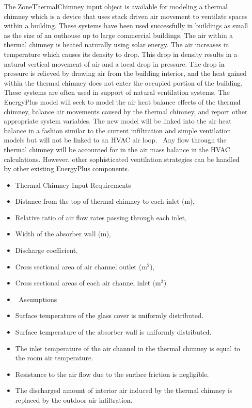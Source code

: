 The ZoneThermalChimney input object is available for modeling a thermal chimney which is a device that uses stack driven air movement to ventilate spaces within a building. These systems have been used successfully in buildings as small as the size of an outhouse up to large commercial buildings. The air within a thermal chimney is heated naturally using solar energy. The air increases in temperature which causes its density to drop. This drop in density results in a natural vertical movement of air and a local drop in pressure. The drop in pressure is relieved by drawing air from the building interior, and the heat gained within the thermal chimney does not enter the occupied portion of the building. These systems are often used in support of natural ventilation systems. The EnergyPlus model will seek to model the air heat balance effects of the thermal chimney, balance air movements caused by the thermal chimney, and report other appropriate system variables. The new model will be linked into the air heat balance in a fashion similar to the current infiltration and simple ventilation models but will not be linked to an HVAC air loop.~ Any flow through the thermal chimney will be accounted for in the air mass balance in the HVAC calculations. However, other sophisticated ventilation strategies can be handled by other existing EnergyPlus components.

\begin{itemize}
\item
  Thermal Chimney Input Requirements
\item
  Distance from the top of thermal chimney to each inlet (m),
\item
  Relative ratio of air flow rates passing through each inlet,
\item
  Width of the absorber wall (m),
\item
  Discharge coefficient,
\item
  Cross sectional area of air channel outlet (m\(^{2}\)),
\item
  Cross sectional areas of each air channel inlet (m\(^{2}\))
\item
  ~Assumptions
\item
  Surface temperature of the glass cover is uniformly distributed.
\item
  Surface temperature of the absorber wall is uniformly distributed.
\item
  The inlet temperature of the air channel in the thermal chimney is equal to the room air temperature.
\item
  Resistance to the air flow due to the surface friction is negligible.
\item
  The discharged amount of interior air induced by the thermal chimney is replaced by the outdoor air infiltration.
\end{itemize}

